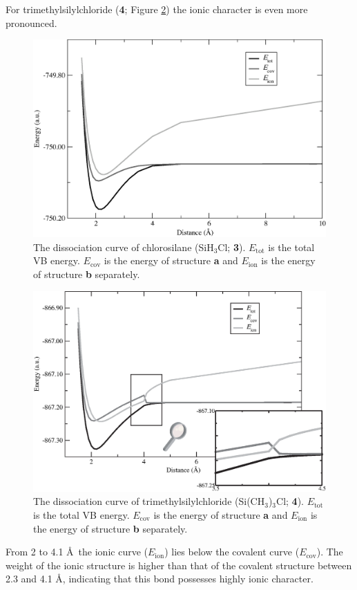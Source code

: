 For trimethylsilylchloride (\textbf{4}; Figure \ref{ch3.fig.c3h9sicl}) the ionic character is even more pronounced.
\begin{figure}[htbp]
\begin{center}
\includegraphics[scale=0.50]{dissociation/figures/sih3cl_g.eps}
\end{center}
\caption{The dissociation curve of chlorosilane (SiH$_3$Cl; \textbf{3}). $E_\mathrm{tot}$ is the total VB energy. $E_\mathrm{cov}$ is the energy of structure \textbf{a} and $E_\mathrm{ion}$ is the energy of structure \textbf{b} separately.}
\label{ch3.fig.sih3cl}
\end{figure}
\begin{figure}[hbtp]
\begin{center}
\includegraphics[scale=0.50]{dissociation/figures/c3h9sicl_g.eps}
\end{center}
\caption{The dissociation curve of trimethylsilylchloride (Si(CH$_3$)$_3$Cl; \textbf{4}). $E_\mathrm{tot}$ is the total VB energy. $E_\mathrm{cov}$ is the energy of structure \textbf{a} and $E_\mathrm{ion}$ is the energy of structure \textbf{b} separately. }
\label{ch3.fig.c3h9sicl}
\end{figure}
From 2 to 4.1 \AA\  the ionic curve ($E_\mathrm{ion}$) lies below the covalent curve ($E_\mathrm{cov}$). 
The weight of the ionic structure is higher than that of the covalent structure between 2.3 and 4.1 \AA, indicating that this bond possesses highly ionic character. 

